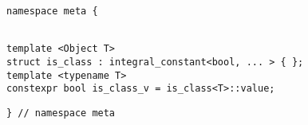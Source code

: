 
\begin{verbatim}
namespace meta {
\end{verbatim}
\begin{verbatim}

template <Object T>
struct is_class : integral_constant<bool, ... > { };
template <typename T>
constexpr bool is_class_v = is_class<T>::value;

\end{verbatim}
\begin{verbatim}
} // namespace meta
\end{verbatim}
